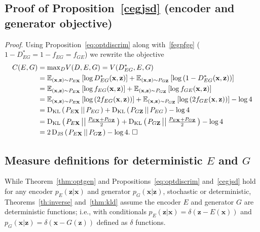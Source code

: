 \documentclass{article}
\newcommand{\proof}{\textit{Proof}.\xspace}
\newcommand{\expect}[2]{\mathbb{E}_{#1}\left[#2\right]}
\newcommand{\logp}[1]{\log\left(#1\right)}
\newcommand{\jsd}[2]{\mathrm{D_{JS}}\left(\left.#1\,\middle|\middle|\,#2\right.\right)}
\newcommand{\kld}[2]{\mathrm{D_{KL}}\left(\left.#1\,\middle|\middle|\,#2\right.\right)}
\renewcommand{\vec}[1]{\mathbf{#1}}
\newcommand{\x}{\vec{x}}
\newcommand{\X}{\vec{X}}
\newcommand{\z}{\vec{z}}
\newcommand{\Z}{\vec{Z}}
\newcommand{\lblsec}[1]{\label{sec:#1}}
\begin{document}
\begin{appendices}
\subsection{Proof of Proposition~\ref{cegjsd} (encoder and generator objective)}
\lblsec{cegjsd}
\cegjsd*
\proof
Using Proposition~\ref{eq:optdiscrim} along with~\eqref{fegpfge} ($
1 - D^*_{EG}
=
1 - f_{EG}
=
f_{GE}$) we rewrite the objective
\begin{align}
\nonumber
C(E, G)
&=
{\begingroup\textstyle \max\endgroup}_D
V(D, E, G)
=
V(D^*_{EG}, E, G)
\\
\nonumber
&=
\expect{(\x, \z) \sim P_{E\X}}{
  \log D^*_{EG}(\x, \z)
}
+
\expect{(\x, \z) \sim P_{G\Z}}{
  \logp{ 1 - D^*_{EG}(\x, \z) }
}
\\
\nonumber
&=
\expect{(\x, \z) \sim P_{E\X}}{
  \log f_{EG}(\x, \z)
}
+
\expect{(\x, \z) \sim P_{G\Z}}{
  \log f_{GE}(\x, \z)
}
\\
\nonumber
&=
\expect{(\x, \z) \sim P_{E\X}}{
  \logp{ 2 f_{EG}(\x, \z) }
}
+
\expect{(\x, \z) \sim P_{G\Z}}{
  \logp{ 2 f_{GE}(\x, \z) }
}
- \log 4
\\ \nonumber
&=
\kld{P_{E\X}}{P_{EG}}
+
\kld{P_{G\Z}}{P_{EG}}
-
\log 4
\\
\nonumber
&=
\kld{P_{E\X}}{\tfrac{P_{E\X}+P_{G\Z}}{2}}
+
\kld{P_{G\Z}}{\tfrac{P_{E\X}+P_{G\Z}}{2}}
-
\log 4
\\
\nonumber
&=
2 \, \jsd{P_{E\X}}{P_{G\Z}}
-
\log 4.
\; \square
\end{align}

\subsection{Measure definitions for deterministic $E$ and $G$}
\label{sec:deteg}
While Theorem~\ref{thm:optgen} and Propositions~\ref{eq:optdiscrim} and~\ref{cegjsd} hold for any encoder $p_E(\z | \x)$ and generator $p_G(\x | \z)$, stochastic or deterministic,
Theorems~\ref{th:inverse} and~\ref{thm:kld} assume the encoder $E$ and generator $G$ are deterministic functions;
i.e., with conditionals $
p_E(\z | \x) = \delta(\z - E(\x))
$ and $
p_G(\x | \z) = \delta(\x - G(\z))
$ defined as $\delta$ functions.


\end{appendices}
\end{document}
